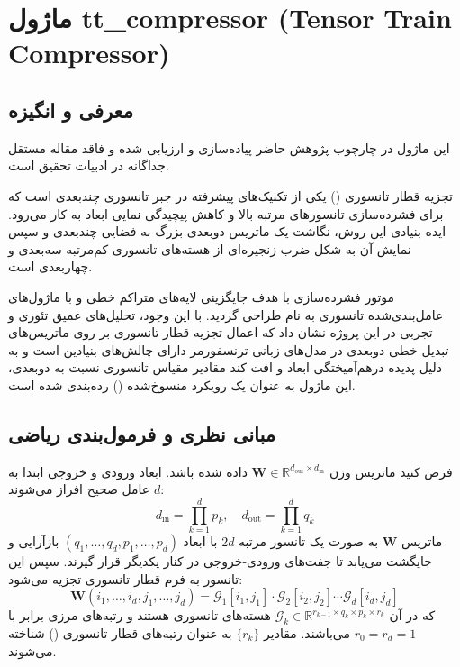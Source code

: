 \section{ماژول tt\_compressor (Tensor Train Compressor)}
\label{sec:module_tt_compressor}

\subsection{معرفی و انگیزه}
این ماژول در چارچوب پژوهش حاضر پیاده‌سازی و ارزیابی شده و فاقد مقاله مستقل جداگانه در ادبیات تحقیق است.

تجزیه قطار تانسوری () یکی از تکنیک‌های پیشرفته در جبر تانسوری چندبعدی است که برای فشرده‌سازی تانسورهای مرتبه بالا و کاهش پیچیدگی نمایی ابعاد به کار می‌رود. ایده بنیادی این روش، نگاشت یک ماتریس دوبعدی بزرگ به فضایی چندبعدی و سپس نمایش آن به شکل ضرب زنجیره‌ای از هسته‌های تانسوری کم‌مرتبه سه‌بعدی و چهاربعدی است.

موتور فشرده‌سازی  با هدف جایگزینی لایه‌های متراکم خطی  و  با ماژول‌های عامل‌بندی‌شده تانسوری به نام  طراحی گردید. با این وجود، تحلیل‌های عمیق تئوری و تجربی در این پروژه نشان داد که اعمال تجزیه قطار تانسوری بر روی ماتریس‌های تبدیل خطی دوبعدی در مدل‌های زبانی ترنسفورمر دارای چالش‌های بنیادین است و به دلیل پدیده درهم‌آمیختگی ابعاد و افت کند مقادیر مقیاس تانسوری نسبت به  دوبعدی، این ماژول به عنوان یک رویکرد منسوخ‌شده () رده‌بندی شده است.

\subsection{مبانی نظری و فرمول‌بندی ریاضی}
فرض کنید ماتریس وزن $\mathbf{W} \in \mathbb{R}^{d_{\text{out}} \times d_{\text{in}}}$ داده شده باشد. ابعاد ورودی و خروجی ابتدا به $d$ عامل صحیح افراز می‌شوند:
\begin{equation}
d_{\text{in}} = \prod_{k=1}^d p_k, \quad d_{\text{out}} = \prod_{k=1}^d q_k
\end{equation}
ماتریس $\mathbf{W}$ به صورت یک تانسور مرتبه $2d$ با ابعاد $(q_1, \dots, q_d, p_1, \dots, p_d)$ بازآرایی و جایگشت می‌یابد تا جفت‌های ورودی-خروجی در کنار یکدیگر قرار گیرند. سپس این تانسور به فرم قطار تانسوری تجزیه می‌شود:
\begin{equation}
\mathbf{W}(i_1, \dots, i_d, j_1, \dots, j_d) = \mathcal{G}_1[i_1, j_1] \cdot \mathcal{G}_2[i_2, j_2] \cdots \mathcal{G}_d[i_d, j_d]
\end{equation}
که در آن $\mathcal{G}_k \in \mathbb{R}^{r_{k-1} \times q_k \times p_k \times r_k}$ هسته‌های تانسوری هستند و رتبه‌های مرزی برابر با $r_0 = r_d = 1$ می‌باشند. مقادیر $\{r_k\}$ به عنوان رتبه‌های قطار تانسوری () شناخته می‌شوند.

